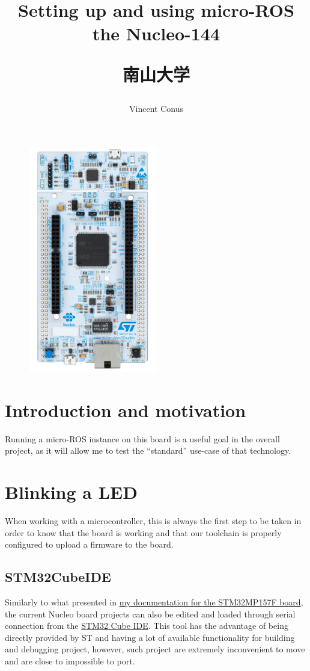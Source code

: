 \documentclass[10pt]{article}
\title{Setting up and using micro-ROS the Nucleo-144 \\[1ex] \large \begin{CJK}{UTF8}{min}南山大学\end{CJK}}
\date{}
\author{Vincent Conus}
\begin{document}
 
\maketitle

\begin{figure}[h]
  \centering
  \includegraphics[width=0.5\textwidth]{./img/board.png}
\end{figure}

\pagebreak
\section{Introduction and motivation}
Running a micro-ROS instance on this board is a useful goal in the overall project, as it will
allow me to test the ``standard'' use-case of that technology.

\section{Blinking a LED}
\label{sec:blinking-led}
When working with a microcontroller, this is always the first step to be taken
in order to know that the board is working and that our toolchain is properly
configured to upload a firmware to the board.

\subsection{STM32CubeIDE}
\label{sec:stm32cubeide}
Similarly to what presented in \href{https://gitlab.com/stm32mp157f-dk2/documentation}{my documentation for the STM32MP157F board}, the current Nucleo board projects can also be edited and loaded through serial connection from the \href{https://www.st.com/en/development-tools/stm32cubeide.html}{STM32 Cube IDE}. This tool has the advantage of being directly provided by ST and having a lot of available functionality for building and debugging project, however, such project are extremely inconvenient to move and are close to impossible to port.\\
\end{document}
